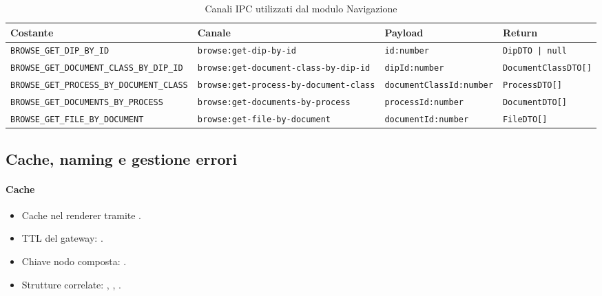 \begin{table}[H]
	\centering
	\footnotesize
	\setlength{\tabcolsep}{4pt}
	\renewcommand{\arraystretch}{1.35}
	\begin{adjustbox}{max width=\textwidth}
	\begin{tabular}{|l|l|l|l|}
		\hline
		\textbf{Costante} & \textbf{Canale} & \textbf{Payload} & \textbf{Return} \\
		\hline
		\texttt{BROWSE\_GET\_DIP\_BY\_ID} & \texttt{browse:get-dip-by-id} & \texttt{id:number} & \texttt{DipDTO | null} \\
		\hline
		\texttt{BROWSE\_GET\_DOCUMENT\_CLASS\_BY\_DIP\_ID} & \texttt{browse:get-document-class-by-dip-id} & \texttt{dipId:number} & \texttt{DocumentClassDTO[]} \\
		\hline
		\texttt{BROWSE\_GET\_PROCESS\_BY\_DOCUMENT\_CLASS} & \texttt{browse:get-process-by-document-class} & \texttt{documentClassId:number} & \texttt{ProcessDTO[]} \\
		\hline
		\texttt{BROWSE\_GET\_DOCUMENTS\_BY\_PROCESS} & \texttt{browse:get-documents-by-process} & \texttt{processId:number} & \texttt{DocumentDTO[]} \\
		\hline
		\texttt{BROWSE\_GET\_FILE\_BY\_DOCUMENT} & \texttt{browse:get-file-by-document} & \texttt{documentId:number} & \texttt{FileDTO[]} \\
		\hline
	\end{tabular}
	\end{adjustbox}
	\caption{Canali IPC utilizzati dal modulo Navigazione}
	\label{tab:navigation:ipc}
\end{table}

\subsection{Cache, naming e gestione errori}

\paragraph{Cache}
\begin{itemize}
	\item Cache nel renderer tramite .
	\item TTL del gateway: .
	\item Chiave nodo composta: .
	\item Strutture correlate: , , .
\end{itemize}

